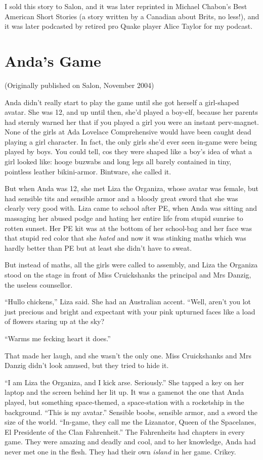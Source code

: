 I sold this story to Salon, and it was later reprinted in Michael
Chabon’s Best American Short Stories (a story written by a Canadian
about Brits, no less!), and it was later podcasted by retired pro
Quake player Alice Taylor for my podcast.

\section{Anda’s Game}

\textsf{(Originally published on Salon, November 2004)}

Anda didn’t really start to play the game until she got herself a
girl-shaped avatar. She was 12, and up until then, she’d played a
boy-elf, because her parents had sternly warned her that if you
played a girl you were an instant perv-magnet. None of the girls at
Ada Lovelace Comprehensive would have been caught dead playing a
girl character. In fact, the only girls she’d ever seen in-game
were being played by boys. You could tell, cos they were shaped
like a boy’s idea of what a girl looked like: hooge buzwabs and
long legs all barely contained in tiny, pointless leather
bikini-armor. Bintware, she called it.

But when Anda was 12, she met Liza the Organiza, whose avatar was
female, but had sensible tits and sensible armor and a bloody great
sword that she was clearly very good with. Liza came to school
after PE, when Anda was sitting and massaging her abused podge and
hating her entire life from stupid sunrise to rotten sunset. Her PE
kit was at the bottom of her school-bag and her face was that
stupid red color that she \emph{hated} and now it was stinking
maths which was hardly better than PE but at least she didn’t have
to sweat.

But instead of maths, all the girls were called to assembly, and
Liza the Organiza stood on the stage in front of Miss Cruickshanks
the principal and Mrs Danzig, the useless counsellor.

“Hullo chickens,” Liza said. She had an Australian accent. “Well,
aren’t you lot just precious and bright and expectant with your
pink upturned faces like a load of flowers staring up at the sky?

“Warms me fecking heart it does.”

That made her laugh, and she wasn’t the only one. Miss Cruickshanks
and Mrs Danzig didn’t look amused, but they tried to hide it.

“I am Liza the Organiza, and I kick arse. Seriously.” She tapped a
key on her laptop and the screen behind her lit up. It was a
game\dash{}not the one that Anda played, but something space-themed, a
space-station with a rocketship in the background. “This is my
avatar.” Sensible boobs, sensible armor, and a sword the size of
the world. “In-game, they call me the Lizanator, Queen of the
Spacelanes, El Presidente of the Clan Fahrenheit.” The Fahrenheits
had chapters in every game. They were amazing and deadly and cool,
and to her knowledge, Anda had never met one in the flesh. They had
their own \emph{island} in her game. Crikey.

